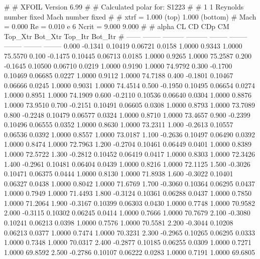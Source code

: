 #  
#       XFOIL         Version 6.99
#  
# Calculated polar for: S1223                                           
#  
# 1 1 Reynolds number fixed          Mach number fixed         
#  
# xtrf =   1.000 (top)        1.000 (bottom)  
# Mach =   0.000     Re =     0.010 e 6     Ncrit =   9.000  9.000
#  
#   alpha    CL        CD       CDp       CM     Top_Xtr  Bot_Xtr  Top_Itr  Bot_Itr
#  ------ -------- --------- --------- -------- -------- -------- -------- --------
   0.000  -0.1341   0.10419   0.06721   0.0158   1.0000   0.9343   1.0000  75.5570
   0.100  -0.1475   0.10445   0.06713   0.0185   1.0000   0.9265   1.0000  75.2587
   0.200  -0.1645   0.10500   0.06710   0.0219   1.0000   0.9190   1.0000  74.9792
   0.300  -0.1700   0.10469   0.06685   0.0227   1.0000   0.9112   1.0000  74.7188
   0.400  -0.1801   0.10467   0.06666   0.0245   1.0000   0.9031   1.0000  74.4514
   0.500  -0.1950   0.10495   0.06654   0.0274   1.0000   0.8951   1.0000  74.1909
   0.600  -0.2110   0.10536   0.06640   0.0304   1.0000   0.8876   1.0000  73.9510
   0.700  -0.2151   0.10491   0.06605   0.0308   1.0000   0.8793   1.0000  73.7089
   0.800  -0.2248   0.10479   0.06577   0.0324   1.0000   0.8710   1.0000  73.4657
   0.900  -0.2399   0.10496   0.06555   0.0352   1.0000   0.8630   1.0000  73.2311
   1.000  -0.2613   0.10557   0.06536   0.0392   1.0000   0.8557   1.0000  73.0187
   1.100  -0.2636   0.10497   0.06490   0.0392   1.0000   0.8474   1.0000  72.7963
   1.200  -0.2704   0.10461   0.06449   0.0401   1.0000   0.8389   1.0000  72.5722
   1.300  -0.2812   0.10452   0.06419   0.0417   1.0000   0.8303   1.0000  72.3426
   1.400  -0.2961   0.10481   0.06404   0.0439   1.0000   0.8216   1.0000  72.1125
   1.500  -0.3026   0.10471   0.06375   0.0444   1.0000   0.8130   1.0000  71.8938
   1.600  -0.3022   0.10401   0.06327   0.0438   1.0000   0.8042   1.0000  71.6769
   1.700  -0.3060   0.10364   0.06295   0.0437   1.0000   0.7949   1.0000  71.4493
   1.800  -0.3124   0.10361   0.06288   0.0437   1.0000   0.7850   1.0000  71.2064
   1.900  -0.3167   0.10399   0.06303   0.0430   1.0000   0.7748   1.0000  70.9582
   2.000  -0.3115   0.10302   0.06245   0.0414   1.0000   0.7666   1.0000  70.7679
   2.100  -0.3080   0.10241   0.06213   0.0398   1.0000   0.7576   1.0000  70.5581
   2.200  -0.3044   0.10208   0.06213   0.0377   1.0000   0.7474   1.0000  70.3231
   2.300  -0.2965   0.10265   0.06295   0.0333   1.0000   0.7348   1.0000  70.0317
   2.400  -0.2877   0.10185   0.06255   0.0309   1.0000   0.7271   1.0000  69.8592
   2.500  -0.2786   0.10107   0.06222   0.0283   1.0000   0.7191   1.0000  69.6805
